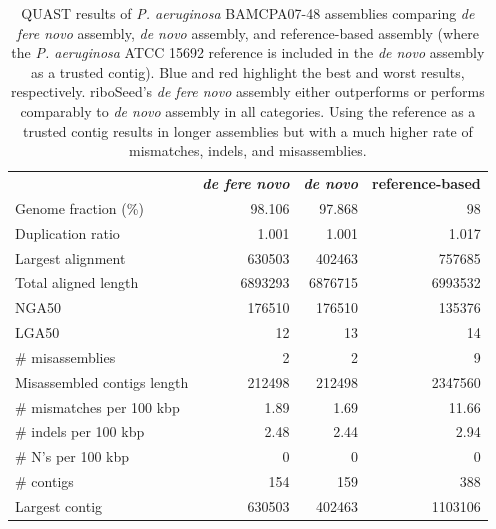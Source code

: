 \documentclass[10pt]{article}
\begin{document}
\begin{table}[]
\centering
\caption{QUAST \cite{Gurevich2013} results of \textit{P. aeruginosa} BAMCPA07-48 assemblies comparing \textit{de fere novo} assembly, \textit{de novo} assembly, and reference-based assembly (where the \textit{P. aeruginosa} ATCC 15692 reference is included in the \textit{de novo} assembly as a trusted contig).  Blue and red highlight the best and worst results, respectively.  riboSeed's \textit{de fere novo} assembly either outperforms or performs comparably to \textit{de novo} assembly in all categories.  Using the reference as a trusted contig results in longer assemblies but with a much higher rate of mismatches, indels, and misassemblies.}
\label{table:full_ref_compare}
\begin{tabular}{lrrr}
  & \textbf{\textit{de fere novo}} & \textbf{\textit{de novo}} & \textbf{reference-based} \\
Genome fraction (\%) & \cellcolor[HTML]{CDCDF9}98.106 & \cellcolor[HTML]{FBDADA}97.868 & 98 \\
Duplication ratio & 1.001 & 1.001 & \cellcolor[HTML]{FBDADA}1.017 \\
Largest alignment & 630503 & \cellcolor[HTML]{FBDADA}402463 & \cellcolor[HTML]{CDCDF9}757685 \\
Total aligned length & 6893293 & \cellcolor[HTML]{FBDADA}6876715 & \cellcolor[HTML]{CDCDF9}6993532 \\
NGA50 & 176510 & 176510 & \cellcolor[HTML]{FBDADA}135376 \\
LGA50 & \cellcolor[HTML]{CDCDF9}12 & 13 & \cellcolor[HTML]{FBDADA}14 \\
\# misassemblies & 2 & 2 & \cellcolor[HTML]{FBDADA}9 \\
Misassembled contigs length & 212498 & 212498 & \cellcolor[HTML]{FBDADA}2347560 \\
\# mismatches per 100 kbp & 1.89 & \cellcolor[HTML]{CDCDF9}1.69 & \cellcolor[HTML]{FBDADA}11.66 \\
\# indels per 100 kbp & 2.48 & \cellcolor[HTML]{CDCDF9}2.44 & \cellcolor[HTML]{FBDADA}2.94 \\
\# N's per 100 kbp & 0 & 0 & 0 \\
\# contigs & \cellcolor[HTML]{CDCDF9}154 & 159 & 388 \\
Largest contig & 630503 & \cellcolor[HTML]{FBDADA}402463 & \cellcolor[HTML]{CDCDF9}1103106 \\

\end{tabular}
\end{table}
\end{document}
